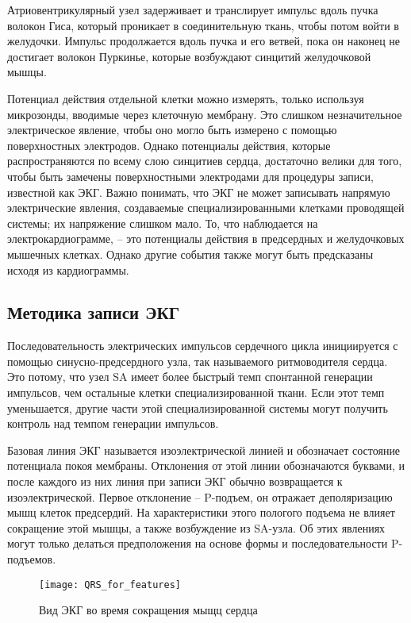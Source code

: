 Атриовентрикулярный узел  задерживает и транслирует импульс вдоль пучка волокон Гиса, который проникает в соединительную ткань, чтобы потом войти в желудочки. Импульс продолжается вдоль пучка и его ветвей, пока он наконец не достигает волокон Пуркинье, которые возбуждают синцитий желудочковой мышцы.

Потенциал действия отдельной клетки можно измерять, только используя микрозонды, вводимые через клеточную мембрану. 
Это слишком незначительное электрическое явление, чтобы оно могло быть измерено с помощью поверхностных электродов. Однако потенциалы действия, которые распространяются по всему слою синцитиев сердца, достаточно велики для того, чтобы быть замечены поверхностными электродами для процедуры записи, известной как ЭКГ. Важно понимать, что ЭКГ не может записывать напрямую электрические явления, создаваемые специализированными клетками проводящей системы; их напряжение слишком мало. То, что наблюдается на электрокардиограмме, -- это потенциалы действия в предсердных и желудочковых мышечных клетках. Однако другие события также могут быть предсказаны исходя из кардиограммы.

\subsection{Методика записи ЭКГ}

Последовательность электрических импульсов сердечного цикла инициируется с помощью синусно-предсердного узла, так называемого ритмоводителя сердца. Это потому, что узел SA имеет более быстрый темп спонтанной генерации импульсов, чем остальные клетки специализированной ткани. Если этот темп уменьшается, другие части этой специализированной системы могут получить контроль над темпом генерации импульсов.

Базовая линия ЭКГ называется изоэлектрической линией и обозначает состояние потенциала покоя мембраны. Отклонения от этой линии обозначаются буквами, и после каждого из них линия при записи ЭКГ обычно возвращается к изоэлектрической. Первое отклонение -- P-подъем, он отражает деполяризацию мышц клеток предсердий. На характеристики этого пологого подъема не влияет сокращение этой мышцы, а также возбуждение из SA-узла. Об этих явлениях могут только делаться предположения на основе формы и последовательности P-подъемов. 

\begin{figure}[h!]
	\begin{center}
		\texttt{[image: QRS\_for\_features]}
		\caption{Вид ЭКГ во время сокращения мыщц сердца}
		\label{ris:QRS}
	\end{center}
\end{figure}

